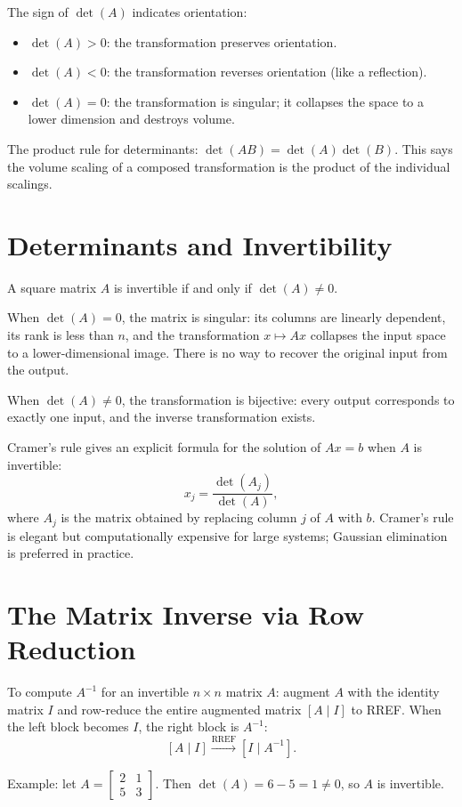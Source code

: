 \documentclass[11pt]{article}
\begin{document}
The sign of $\det(A)$ indicates orientation:
\begin{itemize}
  \item $\det(A) > 0$: the transformation preserves orientation.
  \item $\det(A) < 0$: the transformation reverses orientation (like a reflection).
  \item $\det(A) = 0$: the transformation is singular; it collapses the space to a lower dimension and destroys volume.
\end{itemize}

The product rule for determinants: $\det(AB) = \det(A) \det(B)$. This says the volume scaling of a composed transformation is the product of the individual scalings.

\section*{Determinants and Invertibility}

A square matrix $A$ is invertible if and only if $\det(A) \neq 0$.

When $\det(A) = 0$, the matrix is singular: its columns are linearly dependent, its rank is less than $n$, and the transformation $x \mapsto Ax$ collapses the input space to a lower-dimensional image. There is no way to recover the original input from the output.

When $\det(A) \neq 0$, the transformation is bijective: every output corresponds to exactly one input, and the inverse transformation exists.

Cramer's rule gives an explicit formula for the solution of $Ax = b$ when $A$ is invertible:
\[
x_j = \frac{\det(A_j)}{\det(A)},
\]
where $A_j$ is the matrix obtained by replacing column $j$ of $A$ with $b$. Cramer's rule is elegant but computationally expensive for large systems; Gaussian elimination is preferred in practice.

\section*{The Matrix Inverse via Row Reduction}

To compute $A^{-1}$ for an invertible $n \times n$ matrix $A$: augment $A$ with the identity matrix $I$ and row-reduce the entire augmented matrix $[A \mid I]$ to RREF. When the left block becomes $I$, the right block is $A^{-1}$:
\[
[A \mid I] \xrightarrow{\text{RREF}} [I \mid A^{-1}].
\]

Example: let $A = \begin{bmatrix} 2 & 1 \\ 5 & 3 \end{bmatrix}$. Then $\det(A) = 6 - 5 = 1 \neq 0$, so $A$ is invertible.
\end{document}
